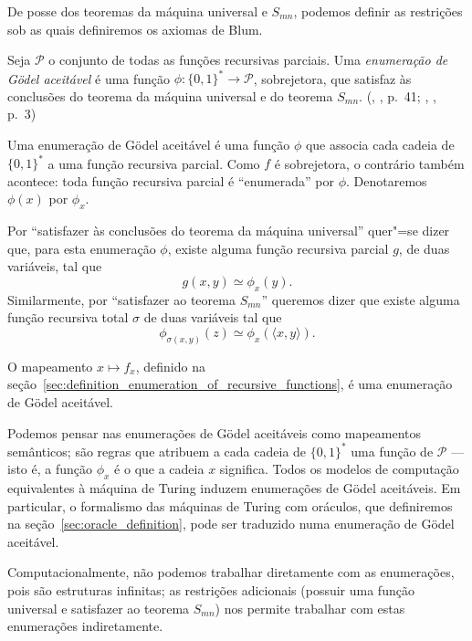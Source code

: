 De posse dos teoremas da máquina universal e $S_{mn}$,
podemos definir as restrições sob as quais definiremos os axiomas de Blum.

\begin{definition}
    Seja $\mathcal P$ o conjunto de todas as funções recursivas parciais.
    Uma \emph{enumeração de Gödel aceitável}
    é uma função $\phi: \{0, 1\}^* \to \mathcal P$, sobrejetora,
    que satisfaz às conclusões do teorema da máquina universal
    e do teorema $S_{mn}$.
    (\citeauthor{Rogers1987}, \citeyear{Rogers1987}, p.~41;
    \citeauthor{Blum1967}, \citeyear{Blum1967}, p.~3)
\end{definition}

Uma enumeração de Gödel aceitável é uma função $\phi$ que associa
cada cadeia de $\{0, 1\}^*$ a uma função recursiva parcial.
Como $f$ é sobrejetora,
o contrário também acontece:
toda função recursiva parcial é ``enumerada'' por $\phi$.
Denotaremos $\phi(x)$ por $\phi_x$.

Por ``satisfazer às conclusões do teorema da máquina universal''
quer"=se dizer que,
para esta enumeração $\phi$,
existe alguma função recursiva parcial $g$, de duas variáveis,
tal que
\begin{equation*}
    g(x, y) \simeq \phi_x(y).
\end{equation*}
Similarmente, por ``satisfazer ao teorema $S_{mn}$'' queremos dizer que
existe alguma função recursiva total $\sigma$ de duas variáveis tal que
\begin{equation*}
    \phi_{\sigma(x, y)}(z) \simeq \phi_x(\langle x, y \rangle).
\end{equation*}

\begin{example}
    O mapeamento $x \mapsto f_x$,
    definido na seção~\ref{sec:definition_enumeration_of_recursive_functions},
    é uma enumeração de Gödel aceitável.
\end{example}

Podemos pensar nas enumerações de Gödel aceitáveis
como mapeamentos semânticos;
são regras que atribuem a cada cadeia de $\{0, 1\}^*$
uma função de $\mathcal P$ --- isto é,
a função $\phi_x$ é o que a cadeia $x$ significa.
Todos os modelos de computação equivalentes à máquina de Turing
induzem enumerações de Gödel aceitáveis.
Em particular,
o formalismo das máquinas de Turing com oráculos,
que definiremos na seção~\ref{sec:oracle_definition},
pode ser traduzido numa enumeração de Gödel aceitável.

Computacionalmente,
não podemos trabalhar diretamente com as enumerações,
pois são estruturas infinitas;
as restrições adicionais
(possuir uma função universal e satisfazer ao teorema $S_{mn}$)
nos permite trabalhar com estas enumerações indiretamente.

